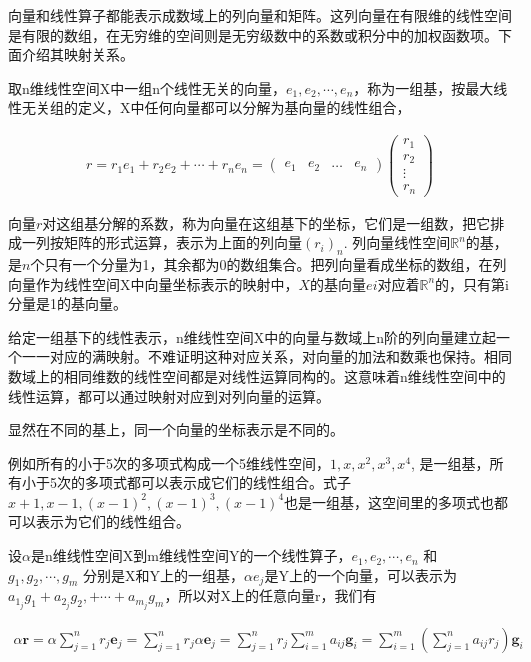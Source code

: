 向量和线性算子都能表示成数域上的列向量和矩阵。这列向量在有限维的线性空间是有限的数组，在无穷维的空间则是无穷级数中的系数或积分中的加权函数项。下面介绍其映射关系。

取n维线性空间X中一组n个线性无关的向量，$ {e_1,e_2,\cdots,e_n} $，称为一组基，按最大线性无关组的定义，X中任何向量都可以分解为基向量的线性组合，

\begin{gather*}
	{r} = r_1{e_1} + r_2{e_2}+ \cdots + r_n{e_n} =\begin{pmatrix} {e_1} &{e_2}  &\dots  & {e_n}\end{pmatrix} \begin{pmatrix}r_1 \\ r_2 \\ \vdots \\r_n \end{pmatrix}
\end{gather*}

向量$ r $对这组基分解的系数，称为向量在这组基下的坐标，它们是一组数，把它排成一列按矩阵的形式运算，表示为上面的列向量$ (r_i)_n $. 列向量线性空间$ \mathbb{R}^n $的基，是$ n $个只有一个分量为1，其余都为0的数组集合。把列向量看成坐标的数组，在列向量作为线性空间X中向量坐标表示的映射中，$ X $的基向量$ ei $对应着$ \mathbb{R}^n $的，只有第i分量是1的基向量。

给定一组基下的线性表示，n维线性空间X中的向量与数域上n阶的列向量建立起一个一一对应的满映射。不难证明这种对应关系，对向量的加法和数乘也保持。相同数域上的相同维数的线性空间都是对线性运算同构的。这意味着n维线性空间中的线性运算，都可以通过映射对应到对列向量的运算。

显然在不同的基上，同一个向量的坐标表示是不同的。

\kaishu

例如所有的小于5次的多项式构成一个5维线性空间，$ 1, x, x^2, x^3,  x^4 $, 是一组基，所有小于5次的多项式都可以表示成它们的线性组合。式子$ x+1, x-1, (x-1)^2,(x-1)^3,(x-1)^4 $也是一组基，这空间里的多项式也都可以表示为它们的线性组合。

\songti

设$ \alpha $是n维线性空间X到m维线性空间Y的一个线性算子，$ {e_1,e_2,\cdots,e_n} $ 和
  $ {g_1,g_2,\cdots,g_m} $ 分别是X和Y上的一组基，$ \alpha e_j $是Y上的一个向量，可以表示为 $ a_{1_{j}}g_1+a_{2_{j}}g_2,+\cdots+a_{m_j}g_m $，所以对X上的任意向量r，我们有

\begin{gather*}
	\alpha\textbf{r}=\alpha \sum_{j=1}^n r_j \textbf{e}_j = \sum_{j=1}^n r_j \alpha \textbf{e}_j = \sum_{j=1}^n r_j \sum_{i=1}^m a_{ij}\textbf{g}_i = \sum_{i=1}^m( \sum_{j=1}^n a_{ij} r_j)\textbf{g}_i	
\end{gather*}


